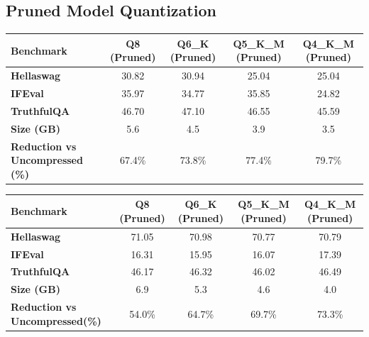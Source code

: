 \documentclass{ifacconf}
\begin{document}
	\subsection{Pruned Model Quantization}
	\begin{strip}
		\begin{minipage}{\textwidth}
			\begin{table}[H]
				\centering
				\begin{tabular}{|l|c|c|c|c|}
					\hline
					\textbf{Benchmark} & \textbf{Q8 (Pruned)} & \textbf{Q6\_K (Pruned)} & \textbf{Q5\_K\_M (Pruned)} & \textbf{Q4\_K\_M (Pruned)} \\ \hline
					\textbf{Hellaswag} & 30.82 & 30.94 & 25.04 & 25.04 \\ \hline
					\textbf{IFEval}    & 35.97 & 34.77 & 35.85 & 24.82 \\ \hline
					\textbf{TruthfulQA} & 46.70 & 47.10 & 46.55 & 45.59 \\ \hline
					\textbf{Size (GB)} & 5.6 & 4.5 & 3.9 & 3.5 \\ \hline
					\textbf{Reduction vs Uncompressed (\%)} & 67.4\% & 73.8\% & 77.4\% & 79.7\% \\ \hline
				\end{tabular}
				\label{tab:gemma_pruned_quantized}
			\end{table}
			
			\begin{table}[H]
				\centering
				\begin{tabular}{|l|c|c|c|c|}
					\hline
					\textbf{Benchmark} & \textbf{Q8 (Pruned)} & \textbf{Q6\_K (Pruned)} & \textbf{Q5\_K\_M (Pruned)} & \textbf{Q4\_K\_M (Pruned)} \\ \hline
					\textbf{Hellaswag} & 71.05 & 70.98 & 70.77 & 70.79 \\ \hline
					\textbf{IFEval}    & 16.31 & 15.95 & 16.07 & 17.39 \\ \hline
					\textbf{TruthfulQA} & 46.17 & 46.32 & 46.02 & 46.49 \\ \hline
					\textbf{Size (GB)} & 6.9 & 5.3 & 4.6 & 4.0 \\ \hline
					\textbf{Reduction vs Uncompressed(\%)} & 54.0\% & 64.7\% & 69.7\% & 73.3\% \\ \hline
				\end{tabular}
				\label{tab:llama_pruned_quantized}
			\end{table}
			

\end{minipage}
\end{strip}
\end{document}
